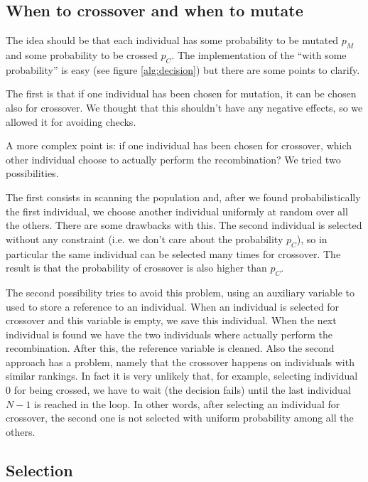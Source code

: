 \documentclass{report}
\begin{document}
\subsection{When to crossover and when to mutate}

The idea should be that each individual has some probability to be mutated $p_M$ and some probability to be crossed $p_C$. The implementation of the ``with some probability'' is easy (see figure \ref{alg:decision}) but there are some points to clarify.

The first is that if one individual has been chosen for mutation, it can be chosen also for crossover. We thought that this shouldn't have any negative effects, so we allowed it for avoiding checks.

A more complex point is: if one individual has been chosen for crossover, which other individual choose to actually perform the recombination? We tried two possibilities.

The first consists in scanning the population and, after we found probabilistically the first individual, we choose another individual uniformly at random over all the others. There are some drawbacks with this. The second individual is selected without any constraint (i.e. we don't care about the probability $p_C$), so in particular the same individual can be selected many times for crossover. The result is that the probability of crossover is also higher than $p_C$.

The second possibility tries to avoid this problem, using an auxiliary variable to used to store a reference to an individual. When an individual is selected for crossover and this variable is empty, we save this individual. When the next individual is found we have the two individuals where actually perform the recombination. After this, the reference variable is cleaned. Also the second approach has a problem, namely that the crossover happens on individuals with similar rankings. In fact it is very unlikely that, for example, selecting individual 0 for being crossed, we have to wait (the decision fails) until the last individual $N-1$ is reached in the loop. In other words, after selecting an individual for crossover, the second one is not selected with uniform probability among all the others.

\subsection{Selection}
\label{sec:select}
\end{document}
